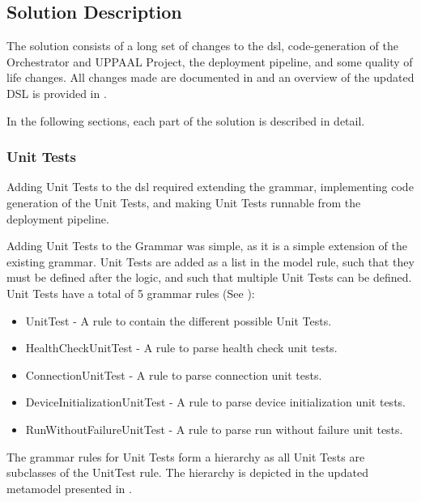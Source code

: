 \subsection{Solution Description}

The solution consists of a long set of changes to the \acrshort{dsl}, code-generation of the Orchestrator and UPPAAL Project, the deployment pipeline, and some quality of life changes. All changes made are documented in  and an overview of the updated DSL is provided in .

In the following sections, each part of the solution is described in detail.

\subsubsection{Unit Tests}

Adding Unit Tests to the \acrshort{dsl} required extending the grammar, implementing code generation of the Unit Tests, and making Unit Tests runnable from the deployment pipeline. 

Adding Unit Tests to the Grammar was simple, as it is a simple extension of the existing grammar. Unit Tests are added as a list in the model rule, such that they must be defined after the logic, and such that multiple Unit Tests can be defined. Unit Tests have a total of 5 grammar rules (See ):

\begin{itemize}
    \item UnitTest - A rule to contain the different possible Unit Tests.
    \item HealthCheckUnitTest - A rule to parse health check unit tests. 
    \item ConnectionUnitTest - A rule to parse connection unit tests.
    \item DeviceInitializationUnitTest - A rule to parse device initialization unit tests.
    \item RunWithoutFailureUnitTest - A rule to parse run without failure unit tests.
\end{itemize}

The grammar rules for Unit Tests form a hierarchy as all Unit Tests are subclasses of the UnitTest rule. The hierarchy is depicted in the updated metamodel presented in .\\

